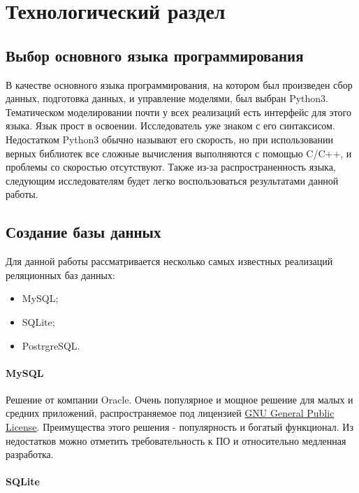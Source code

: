 \chapter{Технологический раздел}

\section{Выбор основного языка программирования}

В качестве основного языка программирования, на котором был произведен сбор данных, подготовка данных, и управление моделями, был выбран Python3. Тематическом моделировании почти у всех реализаций есть интерфейс для этого языка. Язык прост в освоении. Исследователь уже знаком с его синтаксисом. Недостатком Python3 обычно называют его скорость, но при использовании верных библиотек все сложные вычисления выполняются с помощью C/C++, и проблемы со скоростью отсутствуют. Также из-за распространенность языка, следующим исследователям будет легко воспользоваться результатами данной работы.

\section{Создание базы данных}

Для данной работы рассматривается несколько самых известных реализаций реляционных баз данных:

\begin{itemize}
    \item MySQL;
    \item SQLite;
    \item PostrgreSQL.
\end{itemize}

\subsubsection{MySQL}

Решение от компании Oracle. Очень популярное и мощное решение для малых и средних приложений, распространяемое под лицензией \href{https://ru.wikipedia.org/wiki/GNU_General_Public_License}{GNU General Public License}. Преимущества этого решения - популярность и богатый функционал. Из недостатков можно отметить требовательность к ПО и относительно медленная разработка.

\subsubsection{SQLite}


